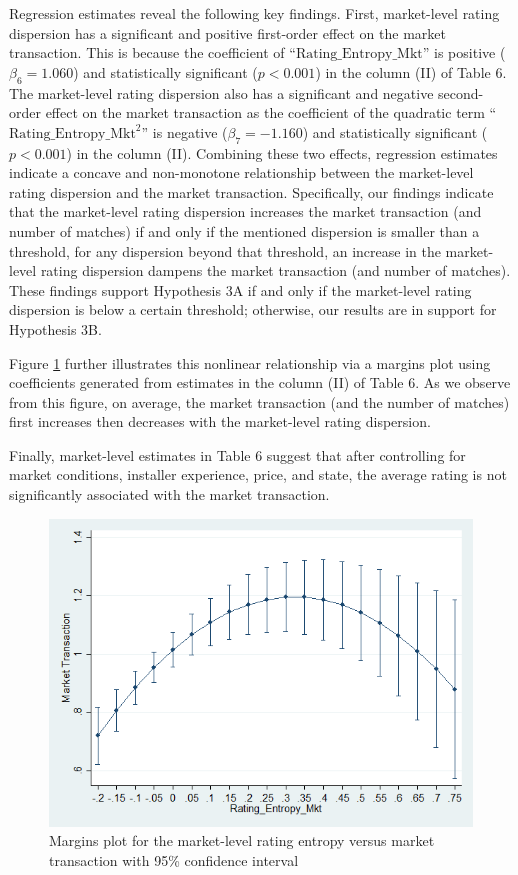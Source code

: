 \documentclass[msom,blindrev]{informs3}
\begin{document}
	
	
	
	
	Regression estimates reveal the following key findings. First, market-level rating dispersion has a significant and positive first-order effect on the market transaction. This is because the coefficient of ``$\text{Rating\_Entropy\_Mkt}$'' is positive ($\beta_{6}=1.060$) and statistically significant ($p<0.001$) in the column (II) of Table 6. The market-level rating dispersion also has a significant and negative second-order effect on the market transaction as the coefficient of the quadratic term ``$\text{Rating\_Entropy\_Mkt}^2$'' is negative ($\beta_{7}=-1.160$) and statistically significant ($p<0.001$) in the column (II). Combining these two effects, regression estimates indicate a concave and non-monotone relationship between the market-level rating dispersion and the market transaction.  Specifically, our findings indicate that the market-level rating dispersion increases the market transaction (and number of matches) if and only if the mentioned dispersion is smaller than a threshold, for any dispersion beyond that threshold, an increase in the market-level rating dispersion dampens the market transaction (and number of matches). These findings support Hypothesis 3A if and only if the market-level rating dispersion is below a certain threshold; otherwise, our results are in support for Hypothesis 3B.
	
	Figure \ref{fig: marginsplot_mkt_entmkt} further illustrates this nonlinear relationship via a margins plot using coefficients generated from estimates in the column (II) of Table 6. As we observe from this figure, on average, the market transaction (and the number of matches) first increases then decreases with the market-level rating dispersion.
	
	Finally, market-level estimates in Table 6 suggest that after controlling for market conditions, installer experience, price, and state, the average rating is not significantly associated with the market transaction.
	\begin{figure}
		\centering
		\includegraphics[width=0.7\linewidth]{marginsplot_entmkt.png}
		\caption{Margins plot for the market-level rating entropy versus market transaction with 95\% confidence interval}
		\label{fig: marginsplot_mkt_entmkt}
	\end{figure}
	
\end{document}
